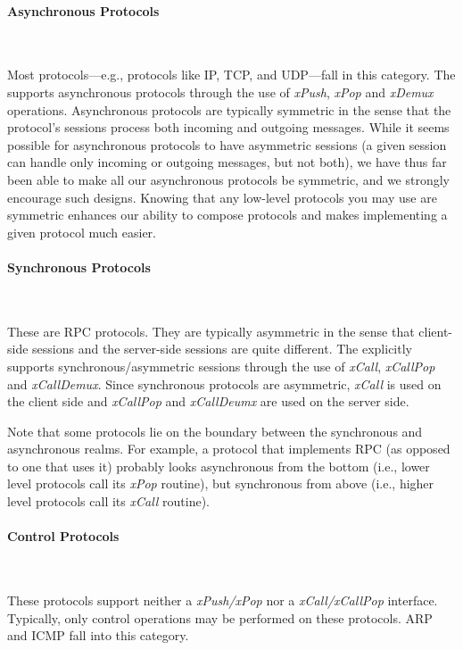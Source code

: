 \paragraph{Asynchronous Protocols}{\ }

\smallskip

\noindent Most protocols---e.g., protocols like IP, TCP, and UDP---fall 
in this category. The \xk{} supports asynchronous protocols through
the use of {\em xPush}, {\em xPop} and {\em xDemux} operations.
Asynchronous protocols are typically symmetric in the sense that the
protocol's sessions process both incoming and outgoing messages.
While it seems possible for asynchronous protocols to have asymmetric
sessions (a given session can handle only incoming or outgoing
messages, but not both), we have thus far been able to make all our
asynchronous protocols be symmetric, and we strongly encourage such
designs.  Knowing that any low-level protocols you may use are
symmetric enhances our ability to compose protocols and makes
implementing a given protocol much easier.

\paragraph{Synchronous Protocols}{\ }

\smallskip

\noindent These are RPC protocols. They are typically asymmetric in the 
sense that client-side sessions and the server-side sessions are quite
different.  The \xk{} explicitly supports synchronous/asymmetric
sessions through the use of {\em xCall}, {\em xCallPop} and {\em
xCallDemux}. Since synchronous protocols are asymmetric, {\em xCall}
is used on the client side and {\em xCallPop} and {\em xCallDeumx} are
used on the server side.

Note that some protocols lie on the boundary between the synchronous
and asynchronous realms. For example, a protocol that implements RPC
(as opposed to one that uses it) probably looks asynchronous from the
bottom (i.e., lower level protocols call its {\em xPop} routine),
but synchronous from above (i.e., higher level protocols call its
{\em xCall} routine).

\paragraph{Control Protocols}{\ }

\smallskip

\noindent These protocols support neither a {\em xPush/xPop} nor a 
{\em xCall/xCallPop} interface.  Typically, only control operations
may be performed on these protocols.  ARP and ICMP fall into this
category.


